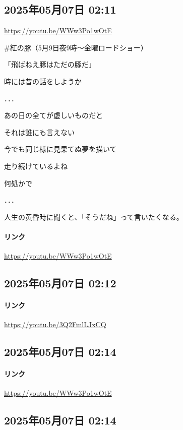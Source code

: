 \subsection*{2025年05月07日 02:11}

\url{https://youtu.be/WWw3Po1wOtE}

\#紅の豚（5月9日夜9時〜金曜ロードショー）

「飛ばねえ豚はただの豚だ」

時には昔の話をしようか

．．．

あの日の全てが虚しいものだと

それは誰にも言えない

今でも同じ様に見果てぬ夢を描いて

走り続けているよね

何処かで

．．．

人生の黄昏時に聞くと、「そうだね」って言いたくなる。

\paragraph{リンク}
\url{https://youtu.be/WWw3Po1wOtE}

\subsection*{2025年05月07日 02:12}

\paragraph{リンク}
\url{https://youtu.be/3Q2FmlLJxCQ}

\subsection*{2025年05月07日 02:14}

\paragraph{リンク}
\url{https://youtu.be/WWw3Po1wOtE}

\subsection*{2025年05月07日 02:14}


